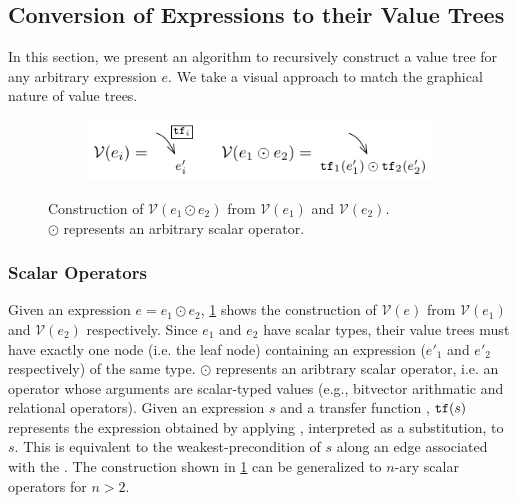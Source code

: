 \subsection{Conversion of Expressions to their Value Trees}
\label{sec:valuetreeconv}
In this section, we present an algorithm to recursively construct a value tree for any arbitrary expression $e$.
We take a visual approach to match the graphical nature of value trees.

\begin{figure}[H]
\begin{subfigure}[b]{\textwidth}
\begin{center}
\includegraphics[scale=1.3]{chapters/figures/figValueTreeConvScalar.pdf}
\end{center}
\end{subfigure}
\caption{\label{fig:valuetreeconvscalar} Construction of $\mathcal{V}(e_1 \odot e_2)$ from $\mathcal{V}(e_1)$ and $\mathcal{V}(e_2)$.\\
$\odot$ represents an arbitrary scalar operator.}
\end{figure}

\subsubsection{Scalar Operators}
Given an expression $e = e_1 \odot e_2$,
\cref{fig:valuetreeconvscalar} shows the construction of $\mathcal{V}(e)$
from $\mathcal{V}(e_1)$ and $\mathcal{V}(e_2)$ respectively.
Since $e_1$ and $e_2$ have scalar types, their value trees must have exactly one
node (i.e. the leaf node) containing an expression ($e'_1$ and $e'_2$ respectively) of the same type.
$\odot$ represents an aribtrary scalar operator, i.e. an operator whose arguments
are scalar-typed values (e.g., bitvector arithmatic and relational operators).
Given an expression $s$ and a transfer function \xfer{}, ${\tt tf}{}(s)$
represents the expression obtained by applying \xfer{}, interpreted as a substitution,
to $s$. This is equivalent to the weakest-precondition of $s$ along an edge associated
with the \xfer{}.
The construction shown in \cref{fig:valuetreeconvscalar} can be generalized to
$n$-ary scalar operators for $n>2$.

